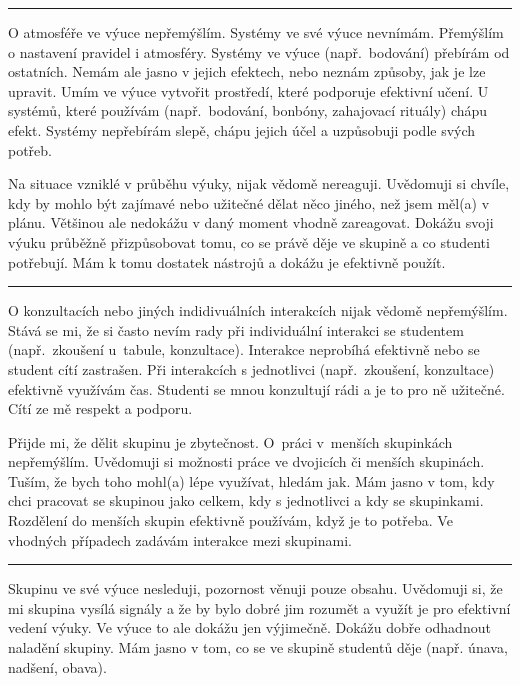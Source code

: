 \rule{\textwidth}{0.4pt}
{O atmosféře ve výuce nepřemýšlím. Systémy ve své výuce nevnímám.}
{Přemýšlím o nastavení pravidel i atmosféry. Systémy ve výuce (např.\ bodování) přebírám od ostatních. Nemám ale jasno v jejich efektech, nebo neznám způsoby, jak je lze upravit.}
{Umím ve výuce vytvořit prostředí, které podporuje efektivní učení. U systémů, které používám (např.\ bodování, bonbóny, zahajovací rituály) chápu efekt. Systémy nepřebírám slepě, chápu jejich účel a uzpůsobuji podle svých potřeb.}

\newpage
{}
{Na situace vzniklé v průběhu výuky, nijak vědomě nereaguji.}
{Uvědomuji si chvíle, kdy by mohlo být zajímavé nebo užitečné dělat něco jiného, než jsem měl(a) v plánu. Většinou ale nedokážu v daný moment vhodně zareagovat.}
{Dokážu svoji výuku průběžně přizpůsobovat tomu, co se právě děje ve skupině a co studenti potřebují. Mám k tomu dostatek nástrojů a dokážu je efektivně použít.}

\rule{\textwidth}{0.4pt}
{O konzultacích nebo jiných indidivuálních interakcích nijak vědomě nepřemýšlím.}
{Stává se mi, že si často nevím rady při individuální interakci se studentem (např.\ zkoušení u~tabule, konzultace). Interakce neprobíhá efektivně nebo se student cítí zastrašen.}
{Při interakcích s jednotlivci (např.\ zkoušení, konzultace) efektivně využívám čas. Studenti se mnou konzultují rádi a je to pro ně užitečné. Cítí ze mě respekt a podporu.}

\newpage
{}
{Přijde mi, že dělit skupinu je zbytečnost. O~práci v~menších skupinkách nepřemýšlím.}
{Uvědomuji si možnosti práce ve dvojicích či menších skupinách. Tuším, že bych toho mohl(a) lépe využívat, hledám jak.}
{Mám jasno v tom, kdy chci pracovat se skupinou jako celkem, kdy s jednotlivci a kdy se skupinkami. Rozdělení do menších skupin efektivně používám, když je to potřeba. Ve vhodných případech zadávám interakce mezi skupinami.}

\rule{\textwidth}{0.4pt}
{Skupinu ve své výuce nesleduji, pozornost věnuji pouze obsahu.}
{Uvědomuji si, že mi skupina vysílá signály a že by bylo dobré jim rozumět a využít je pro efektivní vedení výuky. Ve výuce to ale dokážu jen výjimečně.}
{Dokážu dobře odhadnout naladění skupiny. Mám jasno v tom, co se ve skupině studentů děje (např. únava, nadšení, obava).}
